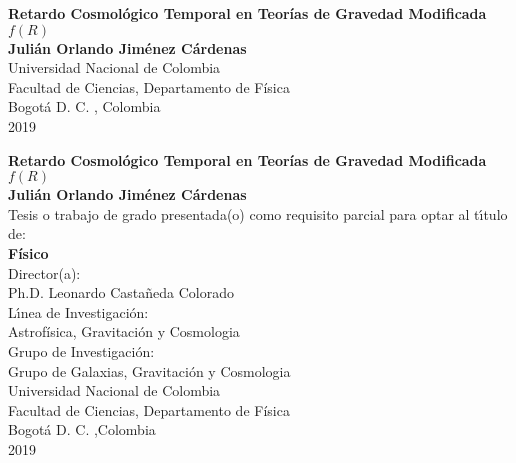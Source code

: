 \begin{center}
\begin{figure}
\centering%
%
\end{figure}
\thispagestyle{empty} \vspace*{2.0cm} \textbf{\huge
Retardo Cosmológico Temporal en Teorías de Gravedad Modificada $f(R)$}\\[6.0cm]
\Large\textbf{Juli\'an Orlando Jim\'enez C\'ardenas}\\[5.5cm]
\small Universidad Nacional de Colombia\\
Facultad de Ciencias, Departamento de F\'isica\\
Bogot\'a D. C. , Colombia\\
2019\\
\end{center}

\newpage{\pagestyle{empty}\cleardoublepage}
\newpage
\begin{center}
\thispagestyle{empty} \vspace*{0cm} \textbf{\huge
Retardo Cosmológico Temporal en Teorías de Gravedad Modificada $f(R)$}\\[3.0cm]
\Large\textbf{Juli\'an Orlando Jim\'enez C\'ardenas}\\[3.0cm]
\small Tesis o trabajo de grado presentada(o) como requisito parcial para optar al
t\'{\i}tulo de:\\
\textbf{F\'isico}\\[2.5cm]
Director(a):\\
Ph.D. Leonardo Casta\~{n}eda Colorado\\[2.0cm]
L\'{\i}nea de Investigaci\'{o}n: \\
Astrof\'isica, Gravitaci\'on y Cosmologia\\
Grupo de Investigaci\'{o}n:\\
Grupo de Galaxias, Gravitaci\'on y Cosmologia\\[2.5cm]
Universidad Nacional de Colombia\\
Facultad de Ciencias, Departamento de F\'isica\\
Bogot\'a D. C. ,Colombia\\
2019\\
\end{center}

\newpage{\pagestyle{empty}\cleardoublepage}

\newpage
\thispagestyle{empty} \textbf{}\normalsize
\\\\\\%

